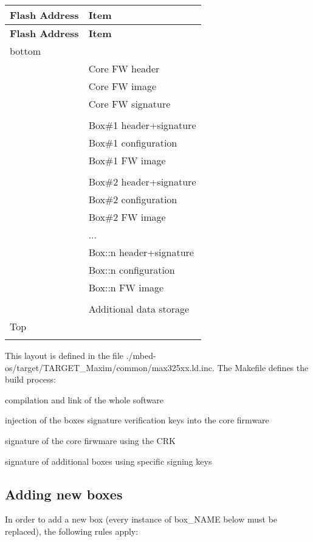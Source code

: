 \tabulinesep=1mm
\begin{longtabu} spread 0pt [c]{*{2}{|X[-1]}|}
\hline
\rowcolor{\tableheadbgcolor}\textbf{ Flash Address }&\textbf{ Item  }\\
\endfirsthead
\hline
\endfoot
\hline
\rowcolor{\tableheadbgcolor}\textbf{ Flash Address }&\textbf{ Item  }\\
\endhead
bottom &\\
&Core FW header \\
&Core FW image \\
&Core FW signature \\
&\\
&Box\#1 header+signature \\
&Box\#1 configuration \\
&Box\#1 FW image \\
&\\
&Box\#2 header+signature \\
&Box\#2 configuration \\
&Box\#2 FW image \\
&... \\
&Box\+::n header+signature \\
&Box\+::n configuration \\
&Box\+::n FW image \\
&\\
&Additional data storage \\
Top &\\
&\\
\end{longtabu}
This layout is defined in the file ./mbed-\/os/target/\+T\+A\+R\+G\+E\+T\+\_\+\+Maxim/common/max325xx.ld.\+inc. The Makefile defines the build process\+:
\begin{DoxyItemize}
\item compilation and link of the whole software
\item injection of the boxes signature verification keys into the core firmware
\item signature of the core firwmare using the C\+RK
\item signature of additional boxes using specific signing keys
\end{DoxyItemize}\hypertarget{_p_c_i_g_u_i_d_a_n_c_e_sub_newboxes}{}\subsection{Adding new boxes}\label{_p_c_i_g_u_i_d_a_n_c_e_sub_newboxes}
In order to add a new box (every instance of box\+\_\+\+N\+A\+ME below must be replaced), the following rules apply\+:


